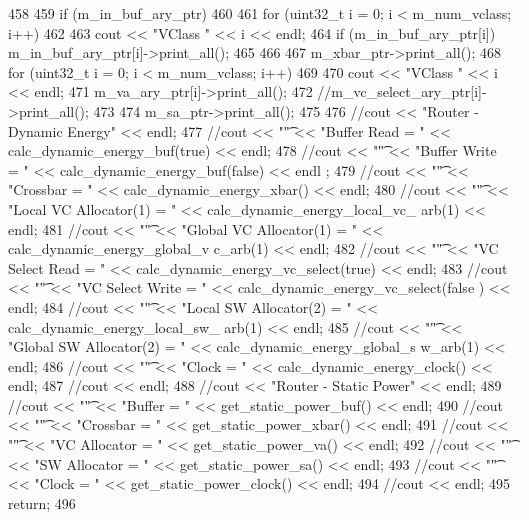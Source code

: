 \begin{DoxyCode}
458 {
459     if (m_in_buf_ary_ptr)
460     {
461         for (uint32_t i = 0; i < m_num_vclass; i++)
462         {
463             cout << "VClass " << i << endl;
464             if (m_in_buf_ary_ptr[i]) m_in_buf_ary_ptr[i]->print_all();
465         }
466     }
467     m_xbar_ptr->print_all();
468     for (uint32_t i = 0; i < m_num_vclass; i++)
469     {
470         cout << "VClass " << i << endl;
471         m_va_ary_ptr[i]->print_all();
472         //m_vc_select_ary_ptr[i]->print_all();
473     }
474     m_sa_ptr->print_all();
475 
476     //cout << "Router - Dynamic Energy" << endl;
477     //cout << "\t" << "Buffer Read = " << calc_dynamic_energy_buf(true) << endl;
478     //cout << "\t" << "Buffer Write = " << calc_dynamic_energy_buf(false) << endl
      ;
479     //cout << "\t" << "Crossbar = " << calc_dynamic_energy_xbar() << endl;
480     //cout << "\t" << "Local VC Allocator(1) = " << calc_dynamic_energy_local_vc_
      arb(1) << endl;
481     //cout << "\t" << "Global VC Allocator(1) = " << calc_dynamic_energy_global_v
      c_arb(1) << endl;
482     //cout << "\t" << "VC Select Read = " << calc_dynamic_energy_vc_select(true) 
      << endl;
483     //cout << "\t" << "VC Select Write = " << calc_dynamic_energy_vc_select(false
      ) << endl;
484     //cout << "\t" << "Local SW Allocator(2) = " << calc_dynamic_energy_local_sw_
      arb(1) << endl;
485     //cout << "\t" << "Global SW Allocator(2) = " << calc_dynamic_energy_global_s
      w_arb(1) << endl;
486     //cout << "\t" << "Clock = " << calc_dynamic_energy_clock() << endl;
487     //cout << endl;
488     //cout << "Router - Static Power" << endl;
489     //cout << "\t" << "Buffer = " << get_static_power_buf() << endl;
490     //cout << "\t" << "Crossbar = " << get_static_power_xbar() << endl;
491     //cout << "\t" << "VC Allocator = " << get_static_power_va() << endl;
492     //cout << "\t" << "SW Allocator = " << get_static_power_sa() << endl;
493     //cout << "\t" << "Clock = " << get_static_power_clock() << endl;
494     //cout << endl;
495     return;
496 }
\end{DoxyCode}


